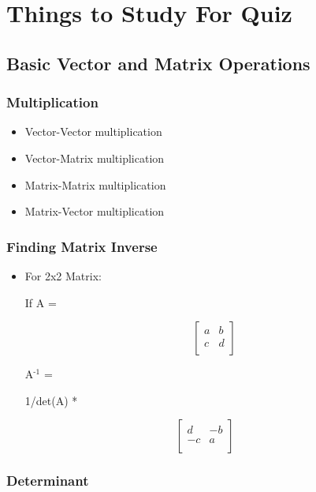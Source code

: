 \documentclass[11pt]{article}
\author{Andrew Chen}
\date{\today}
\title{}
\begin{document}
\tableofcontents

\section{Things to Study For Quiz}
\label{sec:org9a4d9f8}

\subsection{Basic Vector and Matrix Operations}
\label{sec:orgf888579}

\subsubsection{Multiplication}
\label{sec:org50f55f8}

\begin{itemize}
\item Vector-Vector multiplication
\item Vector-Matrix multiplication
\item Matrix-Matrix multiplication
\item Matrix-Vector multiplication
\end{itemize}

\subsubsection{Finding Matrix Inverse}
\label{sec:org7fd45e4}

\begin{itemize}
\item For 2x2 Matrix:

If A =

\[\begin{bmatrix}
        a&b\\
        c&d\\
        \end{bmatrix}\]

A\(^{\text{-1}}\) =

1/det(A) *
\end{itemize}
\[\begin{bmatrix}
        d&-b\\
        -c&a\\
        \end{bmatrix}\]


\subsubsection{Determinant}
\label{sec:orgccc897d}
\end{document}
